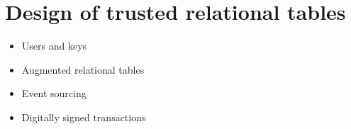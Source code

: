 \section{Design of trusted relational tables}

\begin{itemize}
    \item Users and keys
    \item Augmented relational tables
    \item Event sourcing
    \item Digitally signed transactions
\end{itemize}
